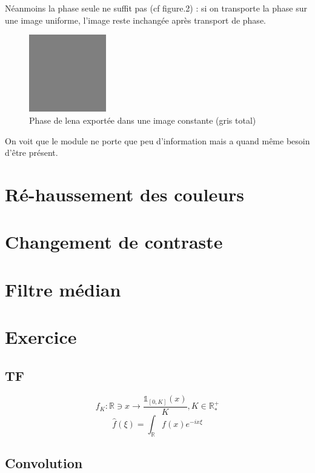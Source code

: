 \documentclass{article}
\begin{document}
Néanmoins la phase seule ne suffit pas (cf figure.2) : si on transporte la phase sur une image uniforme, l'image reste inchangée après transport de phase. 

\begin{figure}[h]

	\includegraphics[width=0.3\textwidth]{phase_swapping_in_grey_image.jpg}

  \caption{Phase de lena exportée dans une image constante (gris total)}
\end{figure}


On voit que le module ne porte que peu d'information mais a quand même besoin d'être présent. 


\section{Ré-haussement des couleurs}

\section{Changement de contraste}

\section{Filtre médian}

\section{Exercice}
\subsection{TF}
$$ f_K : \mathbb{R} \ni x \rightarrow \frac{\mathds{1}_{[0, K]}(x)}{K}, K \in \mathbb{R}_*^+ $$
$$ \hat{f}(\xi) = \int_\mathbb{R} f(x) e^{-ix\xi}$$
\subsection{Convolution}
\end{document}
